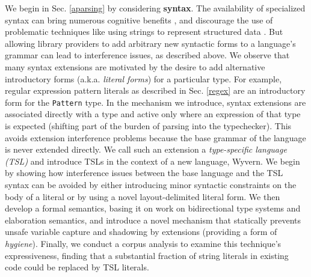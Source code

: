 We begin in Sec. \ref{aparsing} by considering \textbf{syntax}. The availability of specialized syntax can bring numerous cognitive benefits \cite{green1996usability}, and discourage the use of problematic techniques like using strings to represent structured data \cite{Bravenboer:2007:PIA:1289971.1289975}. But allowing library providers to add arbitrary new syntactic forms to a language's grammar can lead to interference issues, as described above. We observe that many syntax extensions are motivated by the desire to add alternative  introductory forms (a.k.a. \emph{literal forms}) for a particular type. For example, regular expression pattern literals as described in Sec. \ref{regex} are an introductory form for the \verb|Pattern| type.  In the mechanism we introduce, syntax extensions are associated directly with a type and active only where an expression of that type is expected (shifting part of the burden of parsing into the typechecker). This avoids extension interference problems because the base grammar of the language is never extended directly. We call such an extension a \emph{type-specific language (TSL)} and introduce TSLs in the context of a new language, Wyvern. We begin by showing how interference issues between the base language and the TSL syntax can be avoided by either introducing minor syntactic constraints on the body of a literal or by using a novel layout-delimited literal form. We then develop a formal semantics, basing it on work on bidirectional type systems and elaboration semantics, and introduce a novel mechanism that statically prevents unsafe variable capture and shadowing by extensions (providing a form of \emph{hygiene}). Finally, we conduct a corpus analysis to examine this technique's expressiveness, finding that a substantial fraction of string literals in existing code could be replaced by TSL literals.


